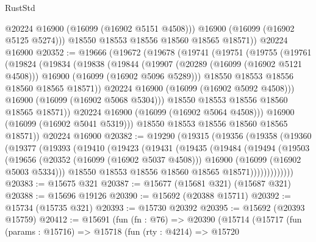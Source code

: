 \begin{lexlean}{RustStd}
\begin{coremodule}
            @20224
            @16900
            (@16099 (@16902 @5151 @4508)))
          @16900
          (@16099 (@16902 @5125 @5274)))
        @18550
        @18553
        @18556
        @18560
        @18565
        @18571))
    @20224
    @16900
@20352 := @19666
    (@19672
      (@19678
        (@19741
          (@19751
            (@19755
              (@19761
                (@19824
                  (@19834
                    (@19838
                      (@19844
                        (@19907
                          (@20289 (@16099 (@16902 @5121 @4508)))
                          @16900
                          (@16099 (@16902 @5096 @5289)))
                        @18550
                        @18553
                        @18556
                        @18560
                        @18565
                        @18571))
                    @20224
                    @16900
                    (@16099 (@16902 @5092 @4508)))
                  @16900
                  (@16099 (@16902 @5068 @5304)))
                @18550
                @18553
                @18556
                @18560
                @18565
                @18571))
            @20224
            @16900
            (@16099 (@16902 @5064 @4508)))
          @16900
          (@16099 (@16902 @5041 @5319)))
        @18550
        @18553
        @18556
        @18560
        @18565
        @18571))
    @20224
    @16900
@20382 := @19290
    (@19315
      (@19356
        (@19358
          (@19360
            (@19377
              (@19393
                (@19410
                  (@19423
                    (@19431
                      (@19435
                        (@19484
                          (@19494
                            (@19503
                              (@19656
                                (@20352 (@16099 (@16902 @5037 @4508)))
                                @16900
                                (@16099 (@16902 @5003 @5334)))
                              @18550
                              @18553
                              @18556
                              @18560
                              @18565
                              @18571)))))))))))))
@20383 := @15675 @321
@20387 := @15677 (@15681 @321) (@15687 @321)
@20388 := @15696 @19126
@20390 := @15692 (@20388 @15711)
@20392 := @15734 (@15735 @321)
@20393 := @15730 @20392
@20395 := @15692 (@20393 @15759)
@20412 := @15691
    (fun (fn : @76) =>
    @20390
      (@15714
        (@15717
          (fun (params : @15716) =>
          @15718
            (fun (rty : @4214) =>
            @15720

\end{coremodule}
\end{lexlean}

